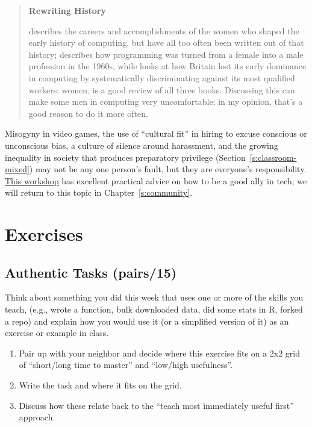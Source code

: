 \begin{quote}\setlength{\parindent}{0pt}
\textbf{Rewriting History}

\cite{Abba2012} describes the careers and accomplishments of the
women who shaped the early history of computing, but have all too
often been written out of that history; \cite{Ensm2003,Ensm2012}
describes how programming was turned from a female into a male
profession in the 1960s, while \cite{Hick2018} looks at how Britain
lost its early dominance in computing by systematically discriminating
against its most qualified workers: women. \cite{Milt2018} is a
good review of all three books. Discussing this can make some men in
computing very uncomfortable; in my opinion, that's a good reason to
do it more often.
\end{quote}

Misogyny in video games, the use of ``cultural fit'' in hiring to excuse
conscious or unconscious bias, a culture of silence around harassment,
and the growing inequality in society that produces preparatory
privilege (Section~\ref{s:classroom-mixed}) may not be any one person's
fault, but they are everyone's responsibility. \href{https://frameshiftconsulting.com/ally-skills-workshop/}{This
workshop} has excellent practical advice on how to be
a good ally in tech; we will return to this topic in
Chapter~\ref{s:community}.

\section{Exercises}\label{s:motivation-exercises}

\subsection{Authentic Tasks (pairs/15)}\label{authentic-tasks-pairs15}

Think about something you did this week that uses one or more of the
skills you teach, (e.g., wrote a function, bulk downloaded data, did
some stats in R, forked a repo) and explain how you would use it (or a
simplified version of it) as an exercise or example in class.

\begin{enumerate}
\item
  Pair up with your neighbor and decide where this exercise fits on a
  2x2 grid of ``short/long time to master'' and ``low/high
  usefulness''.
\item
  Write the task and where it fits on the grid.
\item
  Discuss how these relate back to the ``teach most immediately useful
  first'' approach.
\end{enumerate}


